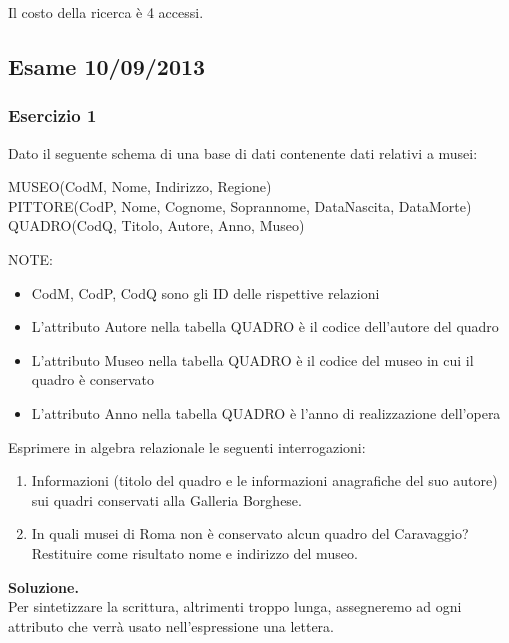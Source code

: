 Il costo della ricerca è 4 accessi.

\newpage
\subsection{Esame 10/09/2013}
  \subsubsection{Esercizio 1}
  Dato il seguente schema di una base di dati contenente dati relativi a musei:
  \begin{center}
  MUSEO(CodM, Nome, Indirizzo, Regione)\\
  PITTORE(CodP, Nome, Cognome, Soprannome, DataNascita, DataMorte)\\
  QUADRO(CodQ, Titolo, Autore, Anno, Museo)\\
  \end{center}
  NOTE: 
  \begin{itemize}
   \item CodM, CodP, CodQ sono gli ID delle rispettive relazioni
   \item L'attributo Autore nella tabella QUADRO è il codice dell'autore del quadro
   \item L'attributo Museo nella tabella QUADRO è il codice del museo in cui il quadro è conservato
   \item L'attributo Anno nella tabella QUADRO è l'anno di realizzazione dell'opera 
  \end{itemize}

 Esprimere in algebra relazionale le seguenti interrogazioni:
 \begin{enumerate}
  \item Informazioni (titolo del quadro e le informazioni anagrafiche del suo autore) sui quadri conservati alla Galleria Borghese.
  \item In quali musei di Roma non è conservato alcun quadro del Caravaggio? Restituire come risultato nome e indirizzo del museo.
 \end{enumerate}

  \noindent\textbf{\fontsize{14pt}{1em}Soluzione.}\\
  Per sintetizzare la scrittura, altrimenti troppo lunga, assegneremo ad ogni attributo che verrà usato
  nell'espressione una lettera.
  
